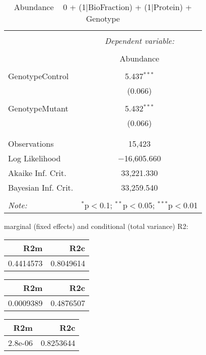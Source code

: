 \documentclass[11pt]{report}
\begin{document}
\begin{table}[!htbp] \centering 
  \caption{Abundance ~ 0 + (1|BioFraction) + (1|Protein) + Genotype} 
  \label{} 
\begin{tabular}{@{\extracolsep{5pt}}lc} 
\\[-1.8ex]\hline 
\hline \\[-1.8ex] 
 & \multicolumn{1}{c}{\textit{Dependent variable:}} \\ 
\cline{2-2} 
\\[-1.8ex] & Abundance \\ 
\hline \\[-1.8ex] 
 GenotypeControl & 5.437$^{***}$ \\ 
  & (0.066) \\ 
  & \\ 
 GenotypeMutant & 5.432$^{***}$ \\ 
  & (0.066) \\ 
  & \\ 
\hline \\[-1.8ex] 
Observations & 15,423 \\ 
Log Likelihood & $-$16,605.660 \\ 
Akaike Inf. Crit. & 33,221.330 \\ 
Bayesian Inf. Crit. & 33,259.540 \\ 
\hline 
\hline \\[-1.8ex] 
\textit{Note:}  & \multicolumn{1}{r}{$^{*}$p$<$0.1; $^{**}$p$<$0.05; $^{***}$p$<$0.01} \\ 
\end{tabular} 
\end{table} 
marginal (fixed effects) and conditional (total variance) R2:

\begin{tabular}{r|r}
\hline
R2m & R2c\\
\hline
0.4414573 & 0.8049614\\
\hline
\end{tabular}

\begin{tabular}{r|r}
\hline
R2m & R2c\\
\hline
0.0009389 & 0.4876507\\
\hline
\end{tabular}

\begin{tabular}{r|r}
\hline
R2m & R2c\\
\hline
2.8e-06 & 0.8253644\\
\hline
\end{tabular}
\end{document}
